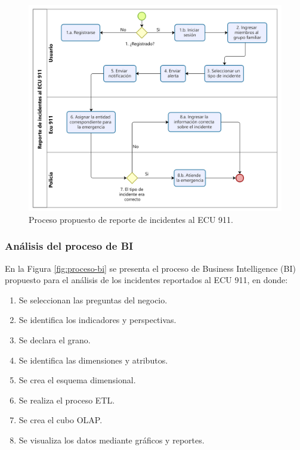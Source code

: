 \begin{figure}[H]
    \centering
    \includegraphics[width=1\textwidth]{chapters/III-resultados-y-discusion/resources/images/proceso-propuesto.png}
    \caption{Proceso propuesto de reporte de incidentes al ECU 911.}
    \label{fig:proceso-propuesto}
\end{figure}

\subsubsection{Análisis del proceso de BI}

En la Figura \ref{fig:proceso-bi} se presenta el proceso de Business Intelligence (BI) propuesto para el análisis de los incidentes reportados al ECU 911, en donde:

\begin{enumerate}
    \item Se seleccionan las preguntas del negocio.
    \item Se identifica los indicadores y perspectivas.
    \item Se declara el grano.
    \item Se identifica las dimensiones y atributos.
    \item Se crea el esquema dimensional.
    \item Se realiza el proceso ETL.
    \item Se crea el cubo OLAP.
    \item Se visualiza los datos mediante gráficos y reportes.
\end{enumerate}

